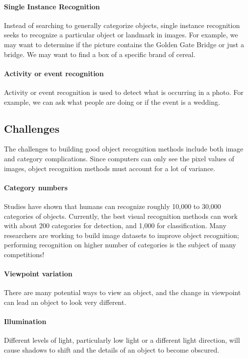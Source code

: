 \documentclass{article}
\begin{document}
\paragraph{Single Instance Recognition}
Instead of searching to generally categorize objects, single instance recognition seeks to recognize a particular object or landmark in images. For example, we may want to determine if the picture contains the Golden Gate Bridge or just a bridge. We may want to find a box of a specific brand of cereal.

\paragraph{Activity or event recognition} Activity or event recognition is used to detect what is occurring in a photo. For example, we can ask what people are doing or if the event is a wedding.

\subsection{Challenges}
The challenges to building good object recognition methods include both image and category complications. Since computers can only see the pixel values of images, object recognition methods must account for a lot of variance.

\paragraph{Category numbers}
Studies have shown that humans can recognize roughly 10,000 to 30,000 categories of objects. Currently, the best visual recognition methods can work with about 200 categories for detection, and 1,000 for classification. Many researchers are working to build image datasets to improve object recognition; performing recognition on higher number of categories is the subject of many competitions!

\paragraph{Viewpoint variation} There are many potential ways to view an object, and the change in viewpoint can lead an object to look very different.

\paragraph{Illumination} Different levels of light, particularly low light or a different light direction, will cause shadows to shift and the details of an object to become obscured.
\end{document}

